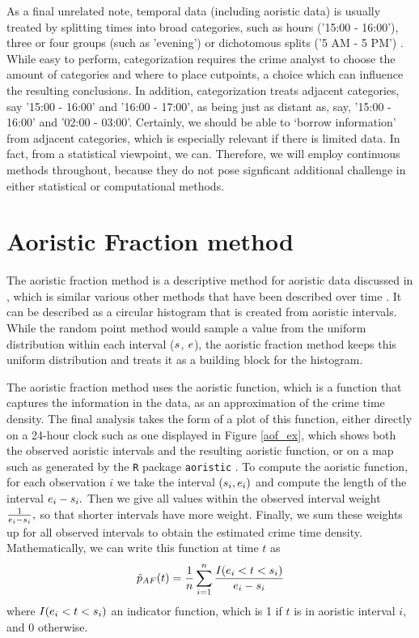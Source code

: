 As a final unrelated note, temporal data (including aoristic data) is usually treated by splitting times into broad categories,  such as hours ('15:00 - 16:00'), three or four groups (such as 'evening') \citep{pereira2016temporal} or dichotomous splits ('5 AM - 5 PM') \citep{felson2003simple}. While easy to perform, categorization requires the crime analyst to choose the amount of categories and where to place cutpoints, a choice which can influence the resulting conclusions. In addition, categorization treats adjacent categories, say '15:00 - 16:00' and '16:00 - 17:00', as being just as distant as, say, '15:00 - 16:00' and '02:00 - 03:00'. Certainly, we should be able to `borrow information' from adjacent categories, which is especially relevant if there is limited data. In fact, from a statistical viewpoint, we can. Therefore, we will employ continuous methods throughout, because they do not pose signficant additional challenge in either statistical or computational methods.

\section{Aoristic Fraction method} \label{afmethod}

The aoristic fraction method is a descriptive method for aoristic data discussed in \citet{ratcliffe1998aoristic}, which is similar various other methods that have been described over time \citep{gottlieb1994crime, rayment1995spatial, brown1998regional}. It can be described as a circular histogram that is created from aoristic intervals. While the random point method would sample a value from the uniform distribution within each interval ($s$, $e$), the aoristic fraction method keeps this uniform distribution and treats it as a building block for the histogram.

The aoristic fraction method uses the aoristic function, which is a function that captures the information in the data, as an approximation of the crime time density. The final analysis takes the form of a plot of this function, either directly on a 24-hour clock such as one displayed in Figure \ref{aof_ex}, which shows both the observed aoristic intervals and the resulting aoristic function, or on a map such as generated by the \texttt{R} package \texttt{aoristic} \citep{kikuchi2015package}. To compute the aoristic function, for each observation $i$ we take the interval $(s_i, e_i)$ and compute the length of the interval $e_i - s_i.$ Then we give all values within the observed interval weight $\frac{1}{e_i - s_i},$ so that shorter intervals have more weight. Finally, we sum these weights up for all observed intervals to obtain the estimated crime time density. Mathematically, we can write this function at time $t$ as
\begin{equation}
\hat{p}_{AF}(t) = \frac{1}{n}\sum_{i=1}^n \frac{I(e_i < t < s_i)}{e_i - s_i}
\end{equation}
where $I(e_i < t < s_i)$ an indicator function, which is 1 if $t$ is in aoristic interval $i$, and 0 otherwise.


